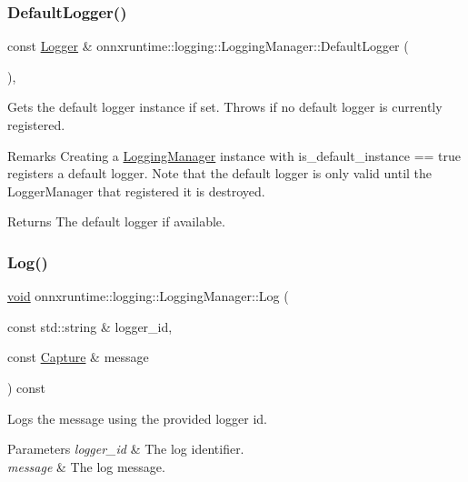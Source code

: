 \subsubsection{\texorpdfstring{Default\+Logger()}{DefaultLogger()}}
{\footnotesize\ttfamily const \mbox{\hyperlink{classonnxruntime_1_1logging_1_1Logger}{Logger}} \& onnxruntime\+::logging\+::\+Logging\+Manager\+::\+Default\+Logger (\begin{DoxyParamCaption}{ }\end{DoxyParamCaption})\hspace{0.3cm}{\ttfamily [inline]}, {\ttfamily [static]}}

Gets the default logger instance if set. Throws if no default logger is currently registered. \begin{DoxyRemark}{Remarks}
Creating a \mbox{\hyperlink{classonnxruntime_1_1logging_1_1LoggingManager}{Logging\+Manager}} instance with is\+\_\+default\+\_\+instance == true registers a default logger. Note that the default logger is only valid until the Logger\+Manager that registered it is destroyed. 
\end{DoxyRemark}
\begin{DoxyReturn}{Returns}
The default logger if available. 
\end{DoxyReturn}
\mbox{\label{classonnxruntime_1_1logging_1_1LoggingManager_a3aa5d44bfb4df7f535a4cf4478a00248}} 
\subsubsection{\texorpdfstring{Log()}{Log()}}
{\footnotesize\ttfamily \mbox{\hyperlink{mlasi_8h_a88f941d423cb2a819b70a1358982b1a6}{void}} onnxruntime\+::logging\+::\+Logging\+Manager\+::\+Log (\begin{DoxyParamCaption}\item[{const std\+::string \&}]{logger\+\_\+id,  }\item[{const \mbox{\hyperlink{classonnxruntime_1_1logging_1_1Capture}{Capture}} \&}]{message }\end{DoxyParamCaption}) const}

Logs the message using the provided logger id. 
\begin{DoxyParams}{Parameters}
{\em logger\+\_\+id} & The log identifier. \\
\hline
{\em message} & The log message. \\
\hline
\end{DoxyParams}
\mbox{\label{classonnxruntime_1_1logging_1_1LoggingManager_ae0a7438714587b804d34dbc656911216}} 
